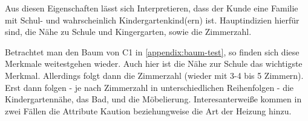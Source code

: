 Aus diesen Eigenschaften lässt sich Interpretieren,
dass der Kunde eine Familie mit Schul- und wahrscheinlich Kindergartenkind(ern) ist.
Hauptindizien hierfür sind, die Nähe zu Schule und Kingergarten, sowie die Zimmerzahl.


Betrachtet man den Baum von C1 in \autoref{appendix:baum-test},
so finden sich diese Merkmale weitestgehen wieder.
Auch hier ist die Nähe zur Schule das wichtigste Merkmal.
Allerdings folgt dann die Zimmerzahl (wieder mit 3-4 bis 5 Zimmern).
Erst dann folgen - je nach Zimmerzahl in unterschiedlichen Reihenfolgen - die Kindergartennähe,
das Bad, und die Möbelierung.
Interesanterweiße kommen in zwei Fällen die Attribute Kaution beziehungweise die Art der Heizung hinzu.
